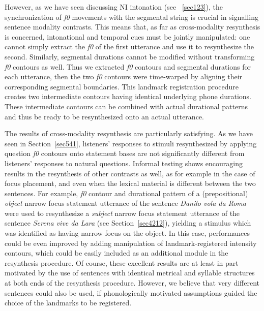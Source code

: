 However, as we have seen discussing NI intonation (see ~\ref{sec123}), the synchronization of \textit{f0} movements with the segmental string is crucial in signalling sentence modality contrasts. This means that, as far as cross-modality resynthesis is concerned, intonational and temporal cues must be jointly manipulated: one cannot simply extract the \textit{f0} of the first utterance and use it to resynthesize the second. Similarly, segmental durations cannot be modified without transforming \textit{f0} contours as well. Thus we extracted \textit{f0} contours and segmental durations for each utterance, then the two \textit{f0} contours were time-warped by aligning their corresponding segmental boundaries. This landmark registration procedure creates two intermediate contours having identical underlying phone durations. These intermediate contours can be combined with actual durational patterns and thus be ready to be resynthesized onto an actual utterance. 

The results of cross-modality resynthesis are particularly satisfying. As we have seen in Section~\ref{sec541}, listeners' responses to stimuli resynthesized by applying question \textit{f0} contours onto statement bases are not significantly different from listeners' responses to natural questions. Informal testing shows encouraging results in the resynthesis of other contrasts as well, as for example in the case of focus placement, and even when the lexical material is different between the two sentences. For example, \textit{f0} contour and durational pattern of a (prepositional) \textit{object} narrow focus statement utterance of the sentence \textit{Danilo vola da Roma} were used to resynthesize a \textit{subject} narrow focus statement utterance of the sentence \textit{Serena vive da Lara} (see Section~\ref{sec4212}), yielding a stimulus which was identified as having narrow focus on the object. In this case, performances could be even improved by adding manipulation of landmark-registered intensity contours, which could be easily included as an additional module in the resynthesis procedure. Of course, these excellent results are at least in part motivated by the use of sentences with identical metrical and syllable structures at both ends of the resynthesis procedure. However, we believe that very different sentences could also be used, if phonologically motivated assumptions guided the choice of the landmarks to be registered.

